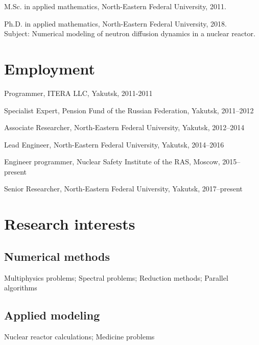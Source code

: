 \documentclass[a4paper]{article}
\renewenvironment{itemize}{
  \begin{list}{}{
    \setlength{\leftmargin}{1.5em}
  }
}{
  \end{list}
}
\begin{document}
\begin{itemize}

  \item M.Sc. in applied mathematics, North-Eastern Federal University, 2011.
  
  \item Ph.D. in applied mathematics,  North-Eastern Federal University, 2018. \\ Subject: Numerical modeling of neutron diffusion dynamics in a nuclear reactor.
\end{itemize}

\section*{Employment}

\begin{itemize}
\item Programmer, ITERA LLC, Yakutsk, 2011-2011
\item Specialist Expert, Pension Fund of the Russian Federation, Yakutsk, 2011--2012
\item Associate Researcher, North-Eastern Federal University, Yakutsk, 2012--2014
\item Lead Engineer, North-Eastern Federal University, Yakutsk, 2014--2016
\item Engineer programmer, Nuclear Safety Institute of the RAS, Moscow, 2015--present
\item Senior Researcher, North-Eastern Federal University, Yakutsk, 2017--present
\end{itemize}

\section*{Research interests}

\subsection*{Numerical methods}
\begin{itemize}
\item{Multiphysics problems; Spectral problems; Reduction methods; Parallel algorithms}
\end{itemize}
\subsection*{Applied modeling}
\begin{itemize}
 \item Nuclear reactor calculations; Medicine problems
\end{itemize} 
\end{document}

